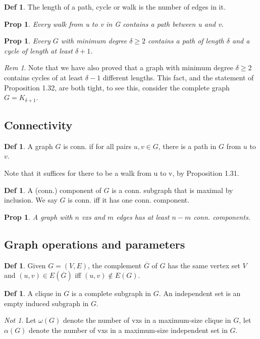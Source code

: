 \documentclass[11pt, fleqn, a4paper, landscape]{article}
\theoremstyle{plain} %
\newtheorem{pro}[thm]{Prop}
\theoremstyle{remark} %
\newtheorem{rem}[thm]{Rem}
\newtheorem{nota}[thm]{Not}
\theoremstyle{definition} %
\newtheorem{defi}[thm]{Def}
\begin{document}
\begin{multicols}{5}
\begin{defi}
The length of a path, cycle or walk is the number of edges in it.
\end{defi}
\addtocounter{thm}{1}
\begin{pro}
Every walk from u to v in G contains a path between u and v.
\end{pro}

\begin{pro}
Every $G$ with minimum degree $ \delta\ge 2$ contains a path of length $\delta$ and a cycle of length at least $\delta + 1$.
\end{pro}

\begin{rem}
Note that we have also proved that a graph with minimum degree $\delta\ge 2$ contains cycles of at least $\delta-1$ different lengths. This fact, and the statement of Proposition 1.32, are both tight, to see this, consider the complete graph $G = K_{\delta+1}$.
\end{rem} 

\subsection{Connectivity}

\begin{defi}
A graph $G$ is conn. if for all pairs $u, v \in G$, there is a path in $G$ from $u$ to $v$.
\end{defi}
Note that it suffices for there to be a walk from u to v, by Proposition 1.31.
\addtocounter{thm}{1}
\begin{defi}
A (conn.) component of $G$ is a conn. subgraph that is maximal by inclusion. We say $G$ is conn. iff it has one conn. component.
\end{defi}
\addtocounter{thm}{1}
\begin{pro}
A graph with $n$ vxs and $m$ edges has at least $n-m$ conn. components.
\end{pro}

\subsection{Graph operations and parameters}

\begin{defi}
Given $G = (V,E)$, the complement $\overline{G}$ of $G$ has the same vertex set $V$ and $(u, v) \in E(\overline{G})$ iff $(u, v) \notin E(G)$.
\end{defi}
\addtocounter{thm}{1}
\begin{defi}
A clique in $G$ is a complete subgraph in $G$. An independent set is an empty
induced subgraph in $G$.
\end{defi}
\addtocounter{thm}{1}
\begin{nota}
Let $\omega(G)$ denote the number of vxs in a maximum-size clique in $G$, let $\alpha(G)$ denote the number of vxs in a maximum-size independent set in $G$.
\end{nota}


\end{multicols}
\end{document}
